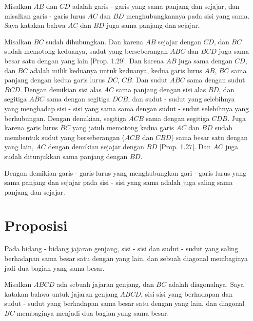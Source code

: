 \documentclass[a4paper]{book}
\begin{document}
Misalkan $AB$ dan $CD$ adalah garis - garis yang sama panjang dan sejajar, dan
misalkan garis - garis lurus $AC$ dan $BD$ menghubungkannya pada sisi yang sama.
Saya katakan bahwa $AC$ dan $BD$ juga sama panjang dan sejajar.

Misalkan $BC$ sudah dihubungkan. Dan karena $AB$ sejajar dengan $CD$, dan $BC$ 
sudah memotong keduanya, sudut yang berseberangan $ABC$ dan $BCD$ juga sama
besar satu dengan yang lain [Prop. 1.29]. Dan karena $AB$ juga sama dengan 
$CD$, dan $BC$ adalah milik keduanya untuk keduanya, kedua garis lurus $AB$, $BC$ sama
panjang dengan kedua garis lurus $DC$, $CB$. Dan sudut $ABC$ sama dengan sudut
$BCD$. Dengan demikian sisi alas $AC$ sama panjang dengan sisi alas $BD$, dan 
segitiga $ABC$ sama dengan segitiga $DCB$, dan sudut - sudut yang selebihnya 
yang menghadap sisi - sisi yang sama sama dengan sudut - sudut selebihnya yang 
berhubungan. Dengan demikian, segitiga $ACB$ sama dengan segitiga $CDB$. Juga
karena garis lurus $BC$ yang jatuh memotong kedua garis $AC$ dan $BD$ sudah
membentuk sudut yang berseberangan ($ACB$ dan $CBD$) sama besar satu dengan 
yang lain, $AC$ dengan demikian sejajar dengan $BD$ [Prop. 1.27]. Dan $AC$ 
juga sudah ditunjukkan sama panjang dengan $BD$.

Dengan demikian garis - garis lurus yang menghubungkan gari - garis lurus 
yang sama panjang dan sejajar pada sisi - sisi yang sama adalah juga saling
 sama panjang dan sejajar.  

\section*{\centering Proposisi \thesection} 
Pada bidang - bidang jajaran genjang, sisi - sisi dan sudut - sudut yang 
saling berhadapan sama besar satu dengan yang lain, dan sebuah diagonal 
membaginya jadi dua bagian yang sama besar.  


Misalkan $ABCD$ ada sebuah jajaran genjang, dan $BC$ adalah diagonalnya. 
Saya katakan bahwa untuk jajaran genjang $ABCD$, sisi sisi yang berhadapan 
dan sudut - sudut yang berhadapan sama besar satu dengan yang lain, 
dan diagonal $BC$ membaginya menjadi dua bagian yang sama besar.
\end{document}
